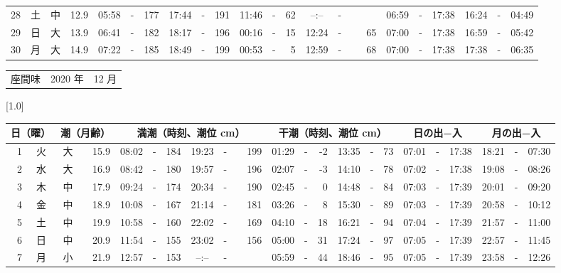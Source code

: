\documentclass[12pt,a4j]{jsarticle}
\begin{document}
\begin{table}[htbp]
\begin{center}
{\begin{tabular}{|rc|cr|ccrccr|ccrccr|ccc|ccc|}
28 & 土 & 中 & 12.9 &  05:58 &-& 177 &  17:44 &-& 191 &  11:46 &-&  62 &  --:-- &-&~~~~~ & 06:59 & -& 17:38 & 16:24 & -& 04:49 \\
29 & 日 & 大 & 13.9 &  06:41 &-& 182 &  18:17 &-& 196 &  00:16 &-&  15 &  12:24 &-&  65 & 07:00 & -& 17:38 & 16:59 & -& 05:42 \\
30 & 月 & 大 & 14.9 &  07:22 &-& 185 &  18:49 &-& 199 &  00:53 &-&   5 &  12:59 &-&  68 & 07:00 & -& 17:38 & 17:38 & -& 06:35 \\
   \hline
   \end{tabular}}
   \end{center}
\end{table}
\newpage
 \begin{table}[htbp]
 \begin{center}
 \begin{tabular}{lcc}
 \LARGE{座間味}  & \large{2020 年} & \large{12 月} \\
 \end{tabular}
 \end{center}
 \begin{center}
    \scalebox{0.7}[1.0]{
    \begin{tabular}{|rc|cr|ccrccr|ccrccr|ccc|ccc|}
    \hline
    \multicolumn{2}{|c|}{日（曜）} & \multicolumn{2}{c|}{潮（月齢）} & \multicolumn{6}{c|}{満潮（時刻、潮位 cm）} & \multicolumn{6}{c|}{干潮（時刻、潮位 cm）} & \multicolumn{3}{c|}{日の出−入} &  \multicolumn{3}{c|}{月の出−入}\\
 \hline
 1 & 火 & 大 & 15.9 &  08:02 &-& 184 &  19:23 &-& 199 &  01:29 &-&  -2 &  13:35 &-&  73 & 07:01 & -& 17:38 & 18:21 & -& 07:30 \\
 2 & 水 & 大 & 16.9 &  08:42 &-& 180 &  19:57 &-& 196 &  02:07 &-&  -3 &  14:10 &-&  78 & 07:02 & -& 17:38 & 19:08 & -& 08:26 \\
 3 & 木 & 中 & 17.9 &  09:24 &-& 174 &  20:34 &-& 190 &  02:45 &-&   0 &  14:48 &-&  84 & 07:03 & -& 17:39 & 20:01 & -& 09:20 \\
 4 & 金 & 中 & 18.9 &  10:08 &-& 167 &  21:14 &-& 181 &  03:26 &-&   8 &  15:30 &-&  89 & 07:03 & -& 17:39 & 20:58 & -& 10:12 \\
 5 & 土 & 中 & 19.9 &  10:58 &-& 160 &  22:02 &-& 169 &  04:10 &-&  18 &  16:21 &-&  94 & 07:04 & -& 17:39 & 21:57 & -& 11:00 \\
 6 & 日 & 中 & 20.9 &  11:54 &-& 155 &  23:02 &-& 156 &  05:00 &-&  31 &  17:24 &-&  97 & 07:05 & -& 17:39 & 22:57 & -& 11:45 \\
 7 & 月 & 小 & 21.9 &  12:57 &-& 153 &  --:-- &-&~~~~~ &  05:59 &-&  44 &  18:46 &-&  95 & 07:05 & -& 17:39 & 23:58 & -& 12:26 \\

\end{tabular}}
\end{center}
\end{table}
\end{document}

